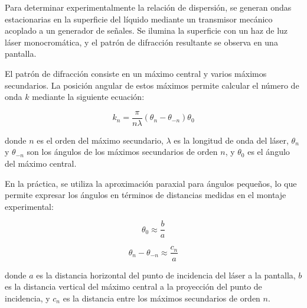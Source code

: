 \vspace{\baselineskip}

Para determinar experimentalmente la relación de dispersión, se generan ondas estacionarias en la superficie del líquido mediante un transmisor mecánico acoplado a un generador de señales. Se ilumina la superficie con un haz de luz láser monocromática, y el patrón de difracción resultante se observa en una pantalla.

\vspace{\baselineskip}

El patrón de difracción consiste en un máximo central y varios máximos secundarios. La posición angular de estos máximos permite calcular el número de onda $k$ mediante la siguiente ecuación:

\vspace{\baselineskip}

\begin{equation}
	k_n = \frac{\pi}{n \lambda}(\theta_n - \theta_{-n}) \theta_0
	\label{eq:numero_onda}
\end{equation}

\vspace{\baselineskip}

donde $n$ es el orden del máximo secundario, $\lambda$ es la longitud de onda del láser, $\theta_n$ y $\theta_{-n}$ son los ángulos de los máximos secundarios de orden $n$, y $\theta_0$ es el ángulo del máximo central.

\vspace{\baselineskip}

En la práctica, se utiliza la aproximación paraxial para ángulos pequeños, lo que permite expresar los ángulos en términos de distancias medidas en el montaje experimental:

\vspace{\baselineskip}

\begin{equation}
	\theta_0 \approx \frac{b}{a}
	\label{eq:theta0}
\end{equation}

\begin{equation}
	\theta_n - \theta_{-n} \approx \frac{c_n}{a}
	\label{eq:thetan}
\end{equation}

\vspace{\baselineskip}

donde $a$ es la distancia horizontal del punto de incidencia del láser a la pantalla, $b$ es la distancia vertical del máximo central a la proyección del punto de incidencia, y $c_n$ es la distancia entre los máximos secundarios de orden $n$.

